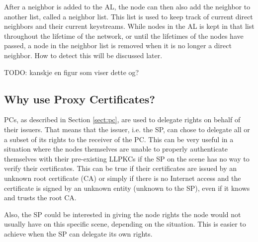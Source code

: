 
After a neighbor is added to the \ac{AL}, the node can then also add the
neighbor to another list, called a neighbor list. This list is used to keep
track of current direct neighbors and their current keystreams. While nodes in
the \ac{AL} is kept in that list throughout the lifetime of the network, or
until the lifetimes of the nodes have passed, a node in the neighbor list is
removed when it is no longer a direct neighbor. How to detect this will be
discussed later.

TODO: kanskje en figur som viser dette og?

\subsection{Why use Proxy Certificates?}
\acp{PC}, as described in Section \ref{sect:pc}, are used to delegate
rights on behalf of their issuers. That means that the issuer, i.e. the \ac{SP},
can chose to delegate all or a subset of its rights to the receiver of the
\ac{PC}. This can be very useful in a situation where the nodes themselves are
unable to properly authenticate themselves with their pre-existing \acp{LLPKC}
if the \ac{SP} on the scene has no way to verify their certificates. This can be
true if their certificates are issued by an unknown root certificate (\ac{CA})
or simply if there is no Internet access and the certificate is signed by an
unknown entity (unknown to the \ac{SP}), even if it knows and trusts the root
\ac{CA}.

Also, the \ac{SP} could be interested in giving the node rights the node would
not usually have on this specific scene, depending on the situation. This is
easier to achieve when the \ac{SP} can delegate its own rights.

